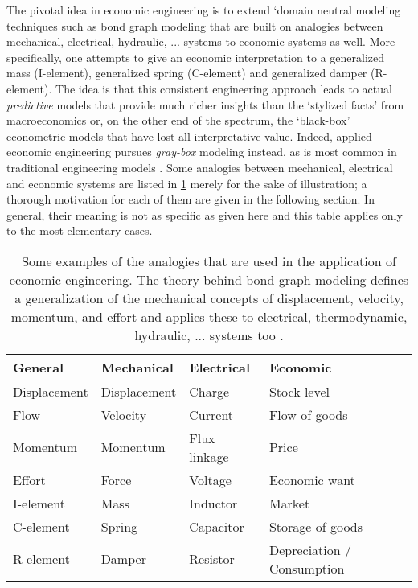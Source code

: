 The pivotal idea in economic engineering is to extend `domain neutral modeling techniques such as bond graph modeling \cite{Karnopp2012} that are built on analogies between mechanical, electrical, hydraulic, ... systems to economic systems as well. More specifically, one attempts to give an economic interpretation to a generalized mass (I-element), generalized spring (C-element) and generalized damper (R-element). The idea is that this consistent engineering approach leads to actual \emph{predictive} models that provide much richer insights than the `stylized facts' from macroeconomics or, on the other end of the spectrum, the `black-box' econometric models that have lost all interpretative value. Indeed, applied economic engineering pursues \emph{gray-box} modeling instead, as is most common in traditional engineering models \cite{Kruimer2021}. Some analogies between mechanical, electrical and economic systems are listed in \cref{tab:analogies} merely for the sake of illustration; a thorough motivation for each of them are given in the following section.  In general, their meaning is not as specific as given here and this table applies only to the most elementary cases. 
\begin{table}[h]
    \centering
    \caption{Some examples of the analogies that are used in the application of economic engineering. The theory behind bond-graph modeling defines a generalization of the mechanical concepts of displacement, velocity, momentum, and effort and applies these to electrical, thermodynamic, hydraulic, ... systems too \cite{Karnopp2012}.}
    \label{tab:analogies}
    \begin{tabular}{llll}
        \toprule
        \textbf{General} & \textbf{Mechanical} & \textbf{Electrical} & \textbf{Economic} \\ 
        \midrule
        Displacement & Displacement & Charge & Stock level\\
        Flow & Velocity & Current & Flow of goods \\
        Momentum & Momentum & Flux linkage & Price \\
        Effort & Force & Voltage & Economic want \\
        \midrule
        I-element & Mass & Inductor & Market \\
        C-element & Spring & Capacitor & Storage of goods \\
        R-element & Damper & Resistor & Depreciation / Consumption \\
        \bottomrule
    \end{tabular}
\end{table}

